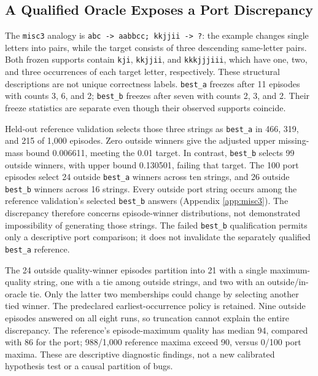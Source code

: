 \documentclass[10pt,letterpaper]{article}
\begin{document}
\subsection{A Qualified Oracle Exposes a Port Discrepancy}\label{sec:misc3-discrepancy}

The \texttt{misc3} analogy is
\texttt{abc\ -\textgreater{}\ aabbcc;\ kkjjii\ -\textgreater{}\ ?}: the example changes
single letters into pairs, while the target consists of three descending same-letter
pairs. Both frozen supports contain \texttt{kji}, \texttt{kkjjii}, and \texttt{kkkjjjiii},
which have one, two, and three occurrences of each target letter, respectively. These
structural descriptions are not unique correctness labels. \texttt{best\_a} freezes after
11 episodes with counts 3, 6, and 2; \texttt{best\_b} freezes after seven with counts 2,
3, and 2. Their freeze statistics are separate even though their observed supports
coincide.

Held-out reference validation selects those three strings as \texttt{best\_a} in 466, 319,
and 215 of 1,000 episodes. Zero outside winners give the adjusted upper missing-mass bound
0.006611, meeting the 0.01 target. In contrast, \texttt{best\_b} selects 99 outside
winners, with upper bound 0.130501, failing that target. The 100 port episodes select 24
outside \texttt{best\_a} winners across ten strings, and 26 outside \texttt{best\_b}
winners across 16 strings. Every outside port string occurs among the reference
validation's selected \texttt{best\_b} answers (Appendix \ref{app:misc3}). The discrepancy
therefore concerns episode-winner distributions, not demonstrated impossibility of
generating those strings. The failed \texttt{best\_b} qualification permits only a
descriptive port comparison; it does not invalidate the separately qualified
\texttt{best\_a} reference.

The 24 outside quality-winner episodes partition into 21 with a single maximum-quality
string, one with a tie among outside strings, and two with an outside/in-oracle tie. Only
the latter two memberships could change by selecting another tied winner. The predeclared
earliest-occurrence policy is retained. Nine outside episodes answered on all eight runs,
so truncation cannot explain the entire discrepancy. The reference's episode-maximum
quality has median 94, compared with 86 for the port; 988/1,000 reference maxima exceed
90, versus 0/100 port maxima. These are descriptive diagnostic findings, not a new
calibrated hypothesis test or a causal partition of bugs.
\end{document}
